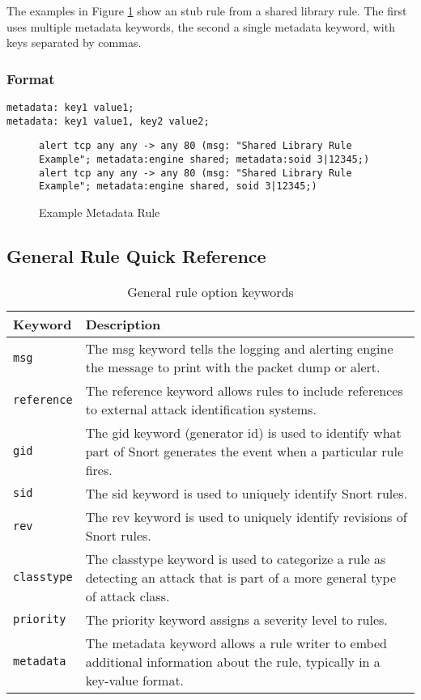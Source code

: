 \documentclass[english]{report}
\begin{document}
The examples in Figure \ref{example metadata rule} show an stub rule from a shared library rule.  The first uses multiple metadata keywords, the second a single metadata keyword, with keys separated by commas.

\subsubsection{Format}

\begin{verbatim}
metadata: key1 value1;
metadata: key1 value1, key2 value2;
\end{verbatim}

\begin{figure}[!hbpt]
\begin{verbatim}
alert tcp any any -> any 80 (msg: "Shared Library Rule Example"; metadata:engine shared; metadata:soid 3|12345;)
alert tcp any any -> any 80 (msg: "Shared Library Rule Example"; metadata:engine shared, soid 3|12345;)
\end{verbatim}

\caption{Example Metadata Rule\label{example metadata rule}}
\end{figure}

\subsection{General Rule Quick Reference}
\begin{center}
\begin{longtable}{| p{1in} | p{5in} |}
\caption{General rule option keywords} \\
\hline
Keyword & Description \\
\hline
\texttt{msg} & The msg keyword tells the logging and alerting engine the message to print with the 
packet dump or alert. \\
\hline
\texttt{reference} & The reference keyword allows rules to include references to
external attack identification systems. \\
\hline
\texttt{gid} & The gid keyword (generator id) is used to identify what part of Snort generates
the event when a particular rule fires. \\
\hline
\texttt{sid} & The sid keyword is used to uniquely identify Snort rules. \\
\hline
\texttt{rev} & The rev keyword is used to uniquely identify revisions of Snort rules. \\
\hline
\texttt{classtype} & The classtype keyword is used to categorize a rule as detecting
an attack that is part of a more general type of attack class. \\
\hline
\texttt{priority} & The priority keyword assigns a severity level to rules. \\
\hline
\texttt{metadata} & The metadata keyword allows a rule writer to embed additional
information about the rule, typically in a key-value format. \\
\hline
\end{longtable}
\end{center}
\end{document}
